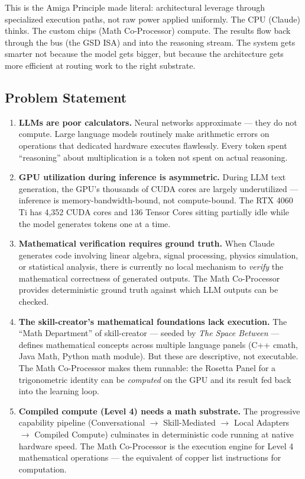 \documentclass[11pt,letterpaper]{article}
\begin{document}
This is the Amiga Principle made literal: architectural leverage through specialized execution paths, not raw power applied uniformly. The CPU (Claude) thinks. The custom chips (Math Co-Processor) compute. The results flow back through the bus (the GSD ISA) and into the reasoning stream. The system gets smarter not because the model gets bigger, but because the architecture gets more efficient at routing work to the right substrate.

\subsection{Problem Statement}

\begin{enumerate}[leftmargin=2em]
\item \textbf{LLMs are poor calculators.} Neural networks approximate --- they do not compute. Large language models routinely make arithmetic errors on operations that dedicated hardware executes flawlessly. Every token spent ``reasoning'' about multiplication is a token not spent on actual reasoning.

\item \textbf{GPU utilization during inference is asymmetric.} During LLM text generation, the GPU's thousands of CUDA cores are largely underutilized --- inference is memory-bandwidth-bound, not compute-bound. The RTX 4060 Ti has 4,352 CUDA cores and 136 Tensor Cores sitting partially idle while the model generates tokens one at a time.

\item \textbf{Mathematical verification requires ground truth.} When Claude generates code involving linear algebra, signal processing, physics simulation, or statistical analysis, there is currently no local mechanism to \textit{verify} the mathematical correctness of generated outputs. The Math Co-Processor provides deterministic ground truth against which LLM outputs can be checked.

\item \textbf{The skill-creator's mathematical foundations lack execution.} The ``Math Department'' of skill-creator --- seeded by \textit{The Space Between} --- defines mathematical concepts across multiple language panels (C++ cmath, Java Math, Python math module). But these are descriptive, not executable. The Math Co-Processor makes them runnable: the Rosetta Panel for a trigonometric identity can be \textit{computed} on the GPU and its result fed back into the learning loop.

\item \textbf{Compiled compute (Level 4) needs a math substrate.} The progressive capability pipeline (Conversational $\rightarrow$ Skill-Mediated $\rightarrow$ Local Adapters $\rightarrow$ Compiled Compute) culminates in deterministic code running at native hardware speed. The Math Co-Processor is the execution engine for Level 4 mathematical operations --- the equivalent of copper list instructions for computation.
\end{enumerate}
\end{document}
